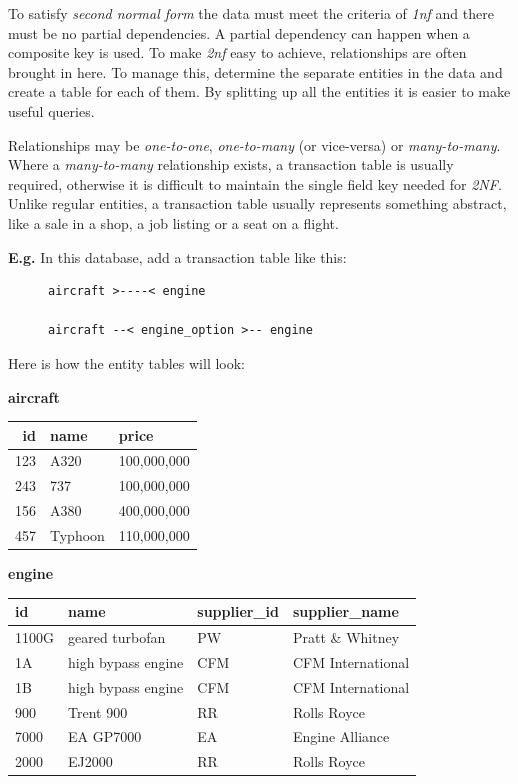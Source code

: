\documentclass[9pt]{article}
\begin{document}
To satisfy \emph{second normal form} the data must meet  the criteria of \emph{1nf} and there must be no partial dependencies. A partial dependency can happen when a composite key is used. To make \emph{2nf} easy to achieve, relationships are often brought in here. To manage this, determine the separate entities in the data and create a table for each of them. By splitting up all the entities it is easier to make useful queries.

Relationships may be \emph{one-to-one}, \emph{one-to-many} (or vice-versa) or \emph{many-to-many}. Where a \emph{many-to-many} relationship exists, a transaction table is usually required, otherwise it is difficult to maintain the single field key needed for \emph{2NF}. Unlike regular entities, a transaction table usually represents something abstract, like a sale in a shop, a job listing or a seat on a flight.

\textbf{E.g.} In this database, add a transaction table like this:

\begin{figure}[H]
\begin{verbatim}
aircraft >----< engine

aircraft --< engine_option >-- engine
\end{verbatim}
\end{figure}

Here is how the entity tables will look:

\textbf{aircraft}

\begin{center}
\begin{tabular}{rll}
\hline
id & name & price\\
\hline
123 & A320 & 100,000,000\\
243 & 737 & 100,000,000\\
156 & A380 & 400,000,000\\
457 & Typhoon & 110,000,000\\
\hline
\end{tabular}
\end{center}

\textbf{engine}

\begin{center}
\begin{tabular}{llll}
\hline
id & name & supplier\_id & supplier\_name\\
\hline
1100G & geared turbofan & PW & Pratt \& Whitney\\
1A & high bypass engine & CFM & CFM International\\
1B & high bypass engine & CFM & CFM International\\
900 & Trent 900 & RR & Rolls Royce\\
7000 & EA GP7000 & EA & Engine Alliance\\
2000 & EJ2000 & RR & Rolls Royce\\
\hline
\end{tabular}
\end{center}
\end{document}
